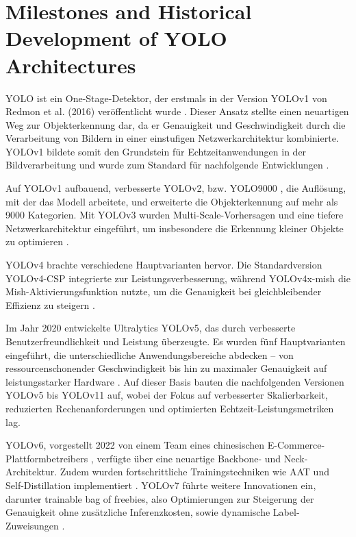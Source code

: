 \section{Milestones and Historical Development of YOLO Architectures}

\acrfull{YOLO} ist ein One-Stage-Detektor, der erstmals in der Version YOLOv1 von Redmon et al. (2016) veröffentlicht wurde \cite{redmon2016}. Dieser Ansatz stellte einen neuartigen Weg zur Objekterkennung dar, da er Genauigkeit und Geschwindigkeit durch die Verarbeitung von Bildern in einer einstufigen Netzwerkarchitektur kombinierte. YOLOv1 bildete somit den Grundstein für Echtzeitanwendungen in der Bildverarbeitung und wurde zum Standard für nachfolgende Entwicklungen \cite{Sapkota2025}.

Auf YOLOv1 aufbauend, verbesserte YOLOv2, bzw. YOLO9000 \cite{Li2018,Nakahara2018}, die Auflösung, mit der das Modell arbeitete, und erweiterte die Objekterkennung auf mehr als 9000 Kategorien. Mit YOLOv3 wurden Multi-Scale-Vorhersagen und eine tiefere Netzwerkarchitektur eingeführt, um insbesondere die Erkennung kleiner Objekte zu optimieren \cite{Kim2018}.

YOLOv4 brachte verschiedene Hauptvarianten hervor. Die Standardversion YOLOv4-CSP integrierte  zur Leistungsverbesserung, während YOLOv4x-mish die Mish-Aktivierungsfunktion nutzte, um die Genauigkeit bei gleichbleibender Effizienz zu steigern \cite{Nepal2022,Sozzi2022,Mohod2023}. 

Im Jahr 2020 entwickelte Ultralytics YOLOv5, das durch verbesserte Benutzerfreundlichkeit und Leistung überzeugte. Es wurden fünf Hauptvarianten eingeführt, die unterschiedliche Anwendungsbereiche abdecken – von ressourcenschonender Geschwindigkeit bis hin zu maximaler Genauigkeit auf leistungsstarker Hardware \cite{Sapkota2025,ultralyics_2020}. Auf dieser Basis bauten die nachfolgenden Versionen YOLOv5 bis YOLOv11 auf, wobei der Fokus auf verbesserter Skalierbarkeit, reduzierten Rechenanforderungen und optimierten Echtzeit-Leistungsmetriken lag.

YOLOv6, vorgestellt 2022 von einem Team eines chinesischen E-Commerce-Plattformbetreibers \cite{li2022}, verfügte über eine neuartige Backbone- und Neck-Architektur. Zudem wurden fortschrittliche Trainingstechniken wie \acrfull{AAT} und Self-Distillation implementiert \cite{Sapkota2025,li2022}. YOLOv7 \cite{wang2022,Wang2023} führte weitere Innovationen ein, darunter trainable bag of freebies, also Optimierungen zur Steigerung der Genauigkeit ohne zusätzliche Inferenzkosten, sowie dynamische Label-Zuweisungen \cite{wang2022,Wang2023,Sapkota2025}.

